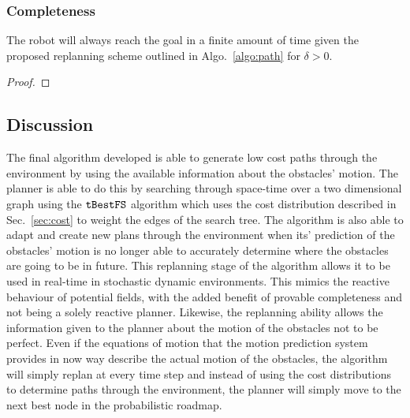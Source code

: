 \subsubsection{Completeness}

\begin{theorem}

    The robot will always reach the goal in a finite amount of time given the
    proposed replanning scheme outlined in Algo.~\ref{algo:path} for $\delta >
    0$.

\end{theorem}

\begin{proof}



\end{proof}

\subsection{Discussion}

\label{sec:plannerdiscussion}

The final algorithm developed is able to generate low cost paths through the
environment by using the available information about the obstacles' motion. The
planner is able to do this by searching through space-time over a two
dimensional graph using the $\Acronym{tBestFS}$ algorithm which uses the cost
distribution described in Sec.~\ref{sec:cost} to weight the edges of the search
tree. The algorithm is also able to adapt and create new plans through the
environment when its' prediction of the obstacles' motion is no longer able to
accurately determine where the obstacles are going to be in future. This
replanning stage of the algorithm allows it to be used in real-time in
stochastic dynamic environments. This mimics the reactive behaviour of
potential fields, with the added benefit of provable completeness and not being
a solely reactive planner. Likewise, the replanning ability allows the
information given to the planner about the motion of the obstacles not to be
perfect. Even if the equations of motion that the motion prediction system
provides in now way describe the actual motion of the obstacles, the algorithm
will simply replan at every time step and instead of using the cost
distributions to determine paths through the environment, the planner will
simply move to the next best node in the probabilistic roadmap.


